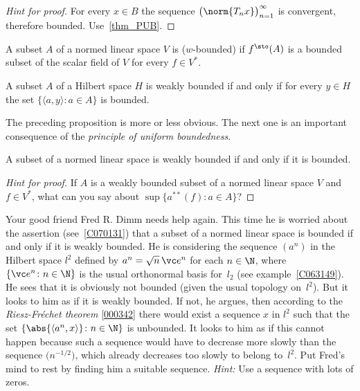 \begin{proof}[\emph{Hint for proof}] For every $x \in B$ the sequence $\bigl(\norm{T_nx}\bigr)_{n=1}^\infty$
is convergent, therefore bounded. Use~\ref{thm_PUB}.   \ns
\end{proof}

\begin{defn} A subset $A$ of a normed linear space $V$ is
 ($w$-bounded) if $f^{\sto}(A)$ is a bounded subset of the scalar
field of $V$ for every $f \in V^*$.
\end{defn}

\begin{prop} A subset $A$ of a Hilbert space $H$ is weakly bounded if and only if for every $y \in H$
the set $\{\langle a,y \rangle \colon a \in A\}$ is bounded.
\end{prop}

The preceding proposition is more or less obvious.  The next one is an important consequence of the
\emph{principle of uniform boundedness}.

\begin{prop}\label{C070131} A subset of a normed linear space is weakly bounded if and only if it
is bounded.
\end{prop}

\begin{proof}[\emph{Hint for proof}] If $A$ is a weakly bounded subset of a normed linear space $V$
and $f \in V^*$, what can you say about $\sup\{a^{**}(f)\colon a \in A\}$?  \ns
\end{proof}

\begin{exer} Your good friend Fred R. Dimm needs help again.  This time he is worried about
the assertion (see~\ref{C070131}) that a subset of a normed linear space is bounded if
and only if it is weakly bounded.  He is considering the sequence $(a^n)$ in the Hilbert
space $l^2$ defined by $a^n = \sqrt{n}\,\vc e^n$ for each $n \in \N$, where $\{\vc
e^n\colon n \in \N\}$ is the usual orthonormal basis for~$l_2$ (see
example~\ref{C063149}).  He sees that it is obviously not bounded (given the usual
topology on~$l^2$).  But it looks to him as if it is weakly bounded.  If not, he argues, then
according to the \emph{Riesz-Fr\'echet theorem} \ref{000342} there would exist a sequence $x$ in
$l^2$ such that the set $\{\abs{\langle a^n,x \rangle}\colon n \in\N\}$ is unbounded. It looks
to him as if this cannot happen because such a sequence would have to decrease more slowly than
the sequence $\bigl(n^{-1/2}\bigr)$, which already decreases too slowly to belong to~$l^2$.
Put Fred's mind to rest by finding him a suitable sequence.  \emph{Hint:} Use a sequence with
lots of zeros.
\end{exer}

